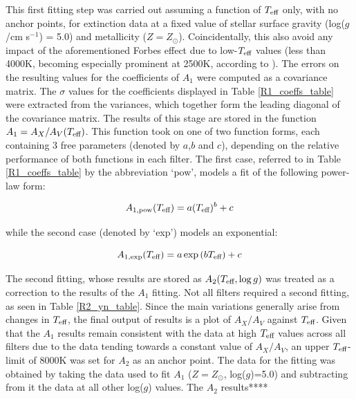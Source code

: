 \documentclass[12pt, a4paper]{report}
\begin{document}
This first fitting step was carried out assuming a function of $T_{\textnormal{eff}}$ only, with no anchor points, for  extinction data at a fixed value of stellar surface gravity (log($g$/cm s$^{-1}$) = 5.0) and metallicity ($Z = Z_{\odot}$). Coincidentally, this also avoid any impact of the aforementioned Forbes effect due to low-$T_{\textnormal{eff}}$ values (less than 4000K, becoming especially prominent at 2500K, according to \cite{2008PASP..120..583G}). The errors on the resulting values for the coefficients of $A_{1}$ were computed as a covariance matrix. The $\sigma$ values for the coefficients displayed in Table \ref{R1_coeffs_table} were extracted from the variances, which together form the leading diagonal of the covariance matrix. The results of this stage are stored in the function $A_{1} = A_{X}/A_{V}(T_{\textnormal{eff}})$. This function took on one of two function forms, each containing 3 free parameters (denoted by $a$,$b$ and $c$), depending on the relative performance of both functions in each filter. The first case, referred to in Table \ref{R1_coeffs_table} by the abbreviation `pow', models a fit of the following power-law form:

\begin{equation}
A_{1,\textnormal{pow}} (T_{\textnormal{eff}}) = a (T_{\textnormal{eff}})^{b} + c
\label{Teff_pow}
\end{equation}

while the second case (denoted by `exp') models an exponential:

\begin{equation}
A_{1,\textnormal{exp}} (T_{\textnormal{eff}}) = a \exp{(b T_{\textnormal{eff}})} + c
\label{Teff_exp}
\end{equation}

The second fitting, whose results are stored as $A_{2}(T_{\textnormal{eff}},\log{g})$ was treated as a correction to the results of the $A_{1}$ fitting. Not all filters required a second fitting, as seen in Table \ref{R2_yn_table}. Since the main variations generally arise from changes in $T_{\textnormal{eff}}$, the final output of results is a plot of $A_{X}/A_{V}$ against $T_{\textnormal{eff}}$. Given that the $A_{1}$ results remain consistent with the data at high $T_{\textnormal{eff}}$ values across all filters due to the data tending towards a constant value of $A_{X}/A_{V}$, an upper $T_{\textnormal{eff}}$-limit of 8000K was set for $A_{2}$ as an anchor point. The data for the fitting was obtained by taking the data used to fit $A_{1}$ ($Z = Z_{\odot}$, log($g$)=5.0) and subtracting from it the data at all other log($g$) values. The $A_{2}$ results****
\end{document}
